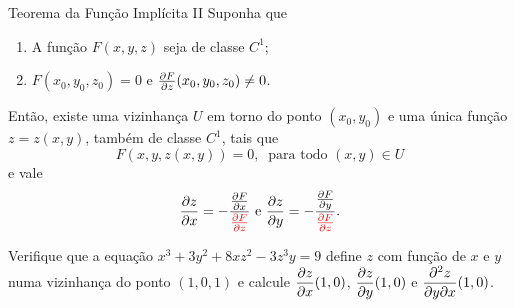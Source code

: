 \begin{frame}[label=der-parciais]{Teorema da Função Implícita II}
Suponha que 
\begin{enumerate}
\item A função $F(x,y,z)$ seja de {\color{blue}classe $C^1$};

\item $F(x_0,y_0,z_0)=0$ e {\color{red}$\frac{\partial F}{\partial z}(x_0,y_0,z_0)\neq 0$}.
\end{enumerate}
Então, existe uma vizinhança $U$ em torno do ponto $(x_0,y_0)$ e uma {\color{blue}única} função $z=z(x,y)$, {\color{blue} também de classe $C^1$}, tais que 
\[F(x,y,z(x,y))=0,\ \text{ para todo } (x,y)\in U \]
 e vale
 \[   \frac{\partial z}{\partial x}=\displaystyle -\frac{\frac{\partial F}{\partial x}}{{\color{red}{\frac{\partial F}{\partial z}}}}\text{ e }   \frac{\partial z}{\partial y}=\displaystyle -\frac{\frac{\partial F}{\partial y}}{{\color{red}{\frac{\partial F}{\partial z}}}}.\] 


\end{frame}


\begin{frame}[label=der-parciais]
\begin{exe}
Verifique que a equação $x^3+3y^2+8xz^2-3z^3y=9$ define $z$ com função de $x$ e $y$ numa vizinhança do ponto $(1,0,1)$ e calcule $\displaystyle\frac{\partial z}{\partial x}(1,0)$, $\displaystyle\frac{\partial z}{\partial y}(1,0)$ e $\displaystyle\frac{\partial^2  z}{\partial y\partial x}(1,0)$.
\end{exe}
\end{frame}


